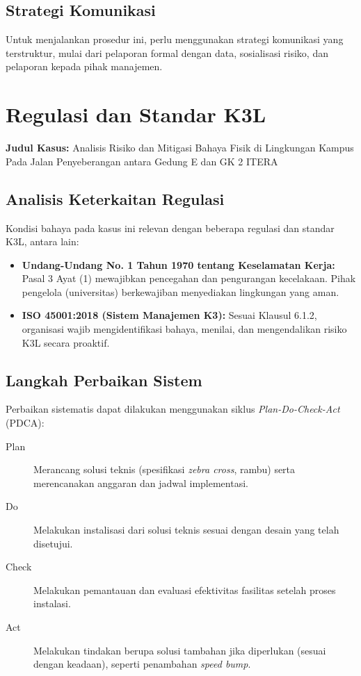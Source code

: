 \documentclass[a4paper, 12pt]{article}
\begin{document}
\subsection{Strategi Komunikasi}
Untuk menjalankan prosedur ini, perlu menggunakan strategi komunikasi yang terstruktur, mulai dari pelaporan formal dengan data,
sosialisasi risiko, dan pelaporan kepada pihak manajemen.

\section{Regulasi dan Standar K3L}
\noindent\textbf{Judul Kasus:}  Analisis Risiko dan Mitigasi Bahaya Fisik di Lingkungan Kampus Pada Jalan Penyeberangan antara Gedung E dan GK 2 ITERA 

\subsection{Analisis Keterkaitan Regulasi}
Kondisi bahaya pada kasus ini relevan dengan beberapa regulasi dan standar K3L, antara lain:
\begin{itemize}
    \item \textbf{Undang-Undang No. 1 Tahun 1970 tentang Keselamatan Kerja:} Pasal 3 Ayat (1) mewajibkan pencegahan dan pengurangan kecelakaan. Pihak pengelola (universitas) berkewajiban menyediakan lingkungan yang aman.
    \item \textbf{ISO 45001:2018 (Sistem Manajemen K3):} Sesuai Klausul 6.1.2, organisasi wajib mengidentifikasi bahaya, menilai, dan mengendalikan risiko K3L secara proaktif.
\end{itemize}

\subsection{Langkah Perbaikan Sistem}
Perbaikan sistematis dapat dilakukan menggunakan siklus \textit{Plan-Do-Check-Act} (PDCA):
\begin{description}
    \item[Plan] Merancang solusi teknis (spesifikasi \textit{zebra cross}, rambu) serta merencanakan anggaran dan jadwal implementasi.
    \item[Do] Melakukan instalisasi dari solusi teknis sesuai dengan desain yang telah disetujui.
    \item[Check] Melakukan pemantauan dan evaluasi efektivitas fasilitas setelah proses instalasi.
    \item[Act] Melakukan tindakan berupa solusi tambahan jika diperlukan (sesuai dengan keadaan), seperti penambahan \textit{speed bump}.
\end{description}
\end{document}
